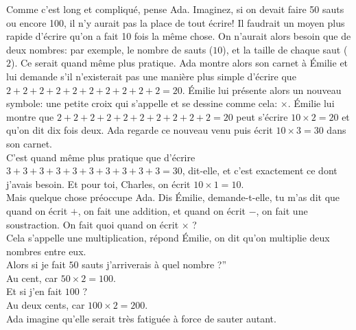 Comme c’est long et compliqué, pense Ada. 
Imaginez, si on devait faire 50 sauts ou encore 100, il n’y aurait pas la place de tout écrire! 
Il faudrait un moyen plus rapide d’écrire qu'on a fait 10 fois la même chose. On n’aurait alors besoin que de deux nombres: par exemple, le nombre de sauts ($10$), et la taille de chaque saut ($2$). Ce serait quand même plus pratique. 
Ada montre alors son carnet à Émilie et lui demande s'il n’existerait pas une manière plus simple d’écrire que $2+2+2+2+2+2+2+2+2+2=20$. Émilie lui présente alors un nouveau symbole: une petite croix qui s’appelle  et se dessine comme cela: $\times$. Émilie lui montre que $2+2+2+2+2+2+2+2+2+2=20$ peut s’écrire $10 \times 2 = 20$ et qu’on dit dix fois deux.
Ada regarde ce nouveau venu puis écrit $10 \times 3 = 30$ dans son carnet. 
\\
\guillemotleft C’est quand même plus pratique que d’écrire $3+3+3+3+3+3+3+3+3+3=30$, dit-elle, et c’est exactement ce dont j’avais besoin. Et pour toi, Charles, on écrit $10 \times 1 = 10$. \guillemotright\\
Mais quelque chose préoccupe Ada. 
\guillemotleft Dis Émilie, demande-t-elle, tu m’as dit que quand on écrit $+$, on fait une addition, et quand on écrit $-$, on fait une soustraction. On fait quoi quand on écrit $\times$ ?\\
\mdash Cela s’appelle une multiplication, répond Émilie, on dit qu’on multiplie deux nombres entre eux.\\
\mdash Alors si je fait $50$ sauts j’arriverais à quel nombre ?”\\
\mdash Au cent, car $50 \times 2 = 100$.\\
\mdash Et si j’en fait $100$ ?\\
\mdash Au deux cents, car $100 \times 2 = 200$. \guillemotright\\
Ada imagine qu'elle serait très fatiguée à force de sauter autant.
